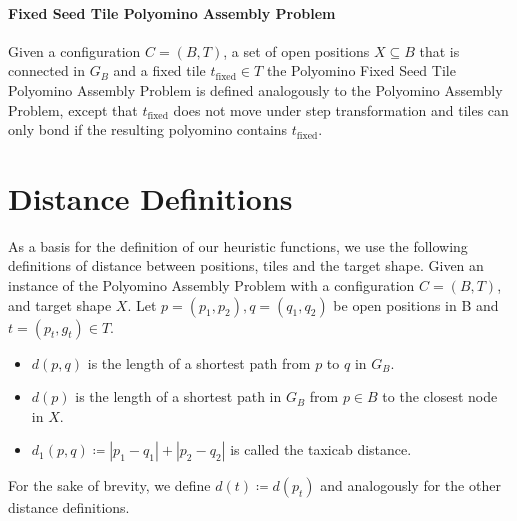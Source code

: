 \paragraph{Fixed Seed Tile Polyomino Assembly Problem}
Given a configuration $C= (B, T)$, a set of open positions $X \subseteq B$ that is connected in $G_{B}$ and a fixed tile $t_{\text{fixed}} \in T$ the Polyomino Fixed Seed Tile Polyomino Assembly Problem is defined analogously to the Polyomino Assembly Problem, except that $t_{\text{fixed}}$ does not move under step transformation and tiles can only bond if the resulting polyomino contains $t_{\text{fixed}}$.


\section{Distance Definitions}
As a basis for the definition of our heuristic functions, we use the following definitions of distance between positions, tiles and the target shape.
Given an instance of the Polyomino Assembly Problem with a configuration $C= (B, T)$, and target shape $X$. Let $p = (p_1, p_2), q = (q_1, q_2)$ be open positions in B and $t=(p_t, g_t) \in T$.
\begin{itemize}
	\setlength\itemsep{0em}
	\item $d(p, q)$ is the length of a shortest path from $p$ to $q$ in $G_{B}$.
	\item $d(p)$ is the length of a shortest path in $G_{B}$ from $p \in B$ to the closest node in $X$.
	\item $d_{1}(p, q) \coloneqq |p_1 - q_1| + |p_2 - q_2|$ is called the taxicab distance.
\end{itemize}
For the sake of brevity, we define $d(t) \coloneqq d(p_t)$ and analogously for the other distance definitions.